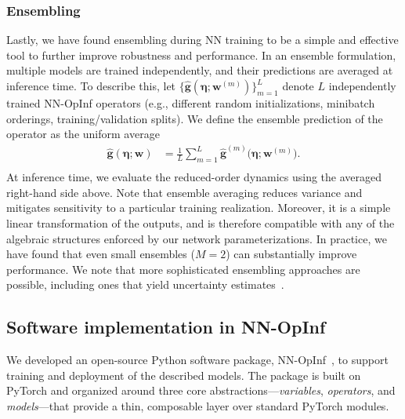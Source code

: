 \documentclass[3p,computermodern,11pt]{elsarticle}
\numberwithin{equation}{section}
\newcommand{\code}[1]{{\ttfamily\color{black} #1}}
\newcommand{\reducedState}{\hat{\state}}
\newcommand{\reducedVelocityNN}{\hat{\boldsymbol g}}
\newcommand{\networkInputs}{\boldsymbol \eta}
\newcommand{\weights}{\mathbf{w}}
\newcommand{\reducedVelocity}{\skew{4}\hat{\velocity}}
\newcommand{\state}{\boldsymbol x}
\newcommand{\velocity}{\boldsymbol f}
\newcommand{\params}{\boldsymbol \mu}
\begin{document}
\subsubsection{Ensembling}
Lastly, we have found ensembling during NN training to be a simple and effective tool to further improve robustness and performance. In an ensemble formulation, multiple models are trained independently, and their predictions are averaged at inference time. To describe this, let $\{\reducedVelocityNN(\networkInputs;\weights^{(m)})\}_{m=1}^{L}$ denote $L$ independently trained NN-OpInf operators (e.g., different random initializations, minibatch orderings, training/validation splits). We define the ensemble prediction of the operator as the uniform average
\begin{equation}\label{eq:composable_nn_ensemble}
\begin{split}
\reducedVelocityNN(\networkInputs ; \weights) &= \frac{1}{L}\sum_{m=1}^L\reducedVelocityNN^{(m)} \big(\networkInputs ; \weights^{(m)} \big) .\\
\end{split}
\end{equation}
At inference time, we evaluate the reduced-order dynamics using the averaged right-hand side above. Note that ensemble averaging reduces variance and mitigates sensitivity to a particular training realization. Moreover, it is a simple linear transformation of the outputs, and is therefore compatible with any of the algebraic structures enforced by our network parameterizations.
In practice, we have found that even small ensembles ($M=2$) can substantially improve performance. We note that more sophisticated ensembling approaches are possible, including ones that yield uncertainty estimates~\cite{lakshminarayanan2017simplescalablepredictiveuncertainty}.

\subsection{Software implementation in NN-OpInf}
We developed an open-source Python software package, \code{NN-OpInf}~\cite{nnopinf}, to support training and deployment of the described models. The package is built on PyTorch and organized around three core abstractions---\emph{variables}, \emph{operators}, and \emph{models}---that provide a thin, composable layer over standard PyTorch modules.
\end{document}
